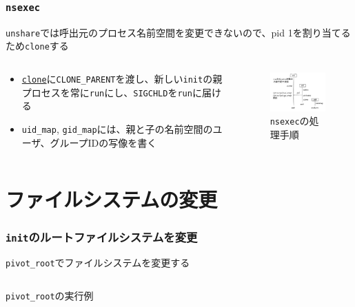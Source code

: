 \documentclass[unicode, 14pt, aspectratio=169]{beamer}
\begin{document}
\begin{frame}[t]
  \frametitle{\texttt{nsexec}}
  \texttt{unshare}では呼出元のプロセス名前空間を変更できないので、pid 1を割り当てるため\texttt{clone}する
  \begin{columns}
    \begin{column}{0.5\textwidth}
      \begin{itemize}[leftmargin=0.8cm,label=$\circ$]
      \item \href{https://man7.org/linux/man-pages/man2/clone.2.html}{\texttt{clone}}に\texttt{CLONE\_PARENT}を渡し、新しい\texttt{init}の親プロセスを常に\texttt{run}にし、\texttt{SIGCHLD}を\texttt{run}に届ける
      \item \texttt{uid\_map}, \texttt{gid\_map}には、親と子の名前空間のユーザ、グループIDの写像を書く
      \end{itemize}
    \end{column}
    \begin{column}{0.5\textwidth}
      \begin{figure}
        \centering
        \includegraphics[width=6cm]{images/nsenter.drawio.pdf}
        \caption{\texttt{nsexec}の処理手順}
        \label{fig:nsenter}
      \end{figure}      
    \end{column}
  \end{columns}
\end{frame} 
\section{ファイルシステムの変更}
\begin{frame}
  \frametitle{\texttt{init}のルートファイルシステムを変更}
  \texttt{pivot\_root}でファイルシステムを変更する
  \begin{center}
    \inputminted{sh}{code/pivot_root.sh}
    \texttt{pivot\_root}の実行例
  \end{center}
\end{frame}
\end{document}

